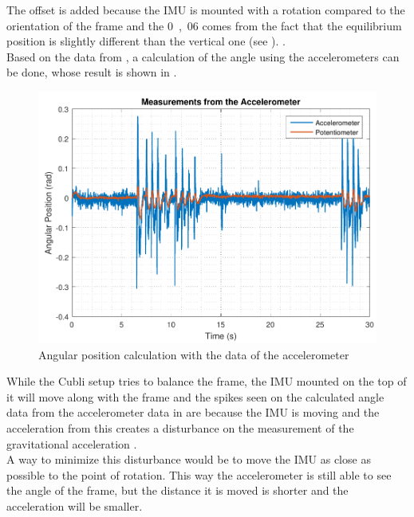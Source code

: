 The offset is added because the IMU is mounted with a \si{} rotation compared to the orientation of the frame and the \si{0,06} comes from the fact that the equilibrium position is slightly different than the vertical one (see ). .\\
Based on the data from , a calculation of the angle using the accelerometers can be done, whose result is shown in .
%
\begin{figure}[H]
	\centering
	\includegraphics[scale=0.65]{figures/angleAcc}
	\caption{Angular position calculation with the data of the accelerometer}
	\label{angleAcc}
\end{figure}\vspace{-5mm}
%
While the Cubli setup tries to balance the frame, the IMU mounted on the top of it will move along with the frame and the spikes seen on the calculated angle data from the accelerometer data in  are because the IMU is moving and the acceleration from this creates a disturbance on the measurement of the gravitational acceleration \cite{JWarren}.\\
A way to minimize this disturbance would be to move the IMU as close as possible to the point of rotation. This way the accelerometer is still able to see the angle of the frame, but the distance it is moved is shorter and the acceleration will be smaller. 

